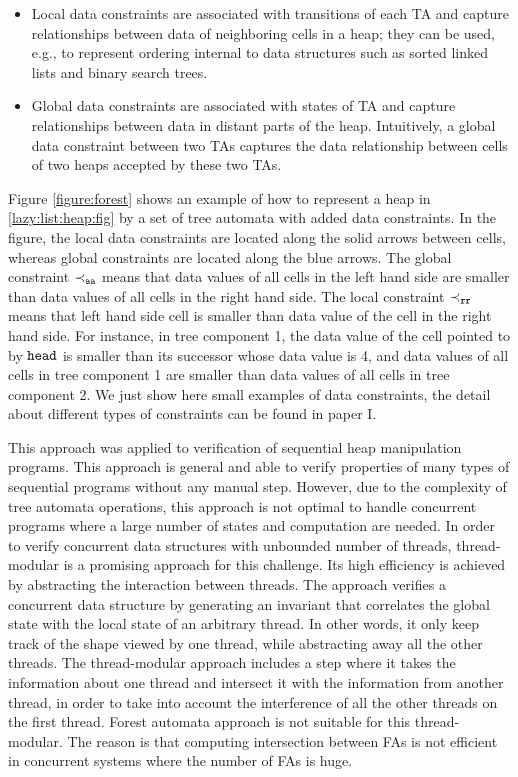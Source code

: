  \begin{itemize}
 	\item Local data constraints are associated with transitions of each TA and capture relationships between data of neighboring cells in a heap; they can be used, e.g., to represent ordering internal to data structures such as sorted linked lists and binary search trees.
 	\item Global data constraints are associated with states of TA and capture relationships between data in distant parts of the heap. Intuitively, a global data constraint between two TAs captures the data relationship between cells of two heaps accepted by these two TAs. 
 \end{itemize}
Figure \ref{figure:forest} shows an example of how to represent a heap in \ref{lazy:list:heap:fig} by a set of tree automata with added data constraints. In the figure, the local data constraints are located along the solid arrows between cells, whereas global constraints are located along the blue arrows. The global constraint $\tt \prec_{aa}$ means that data values of all cells in the left hand side are smaller than data values of all cells in the right hand side. The local constraint $\tt \prec_{rr}$ means that left hand side cell is smaller than data value of the cell in the right hand side. For instance, in tree component 1, the data value of the cell pointed to by $\tt head$ is smaller than its successor whose data value is 4, and data values of all cells in tree component 1 are smaller than data values of all cells in tree component 2. We just show here small examples of data constraints, the detail about different types of constraints can be found in paper I.    

This approach was applied to verification of sequential heap manipulation programs. This approach is general and able to verify properties of many types of sequential programs without any manual step. However, due to the complexity of tree automata operations, this approach is not optimal to handle concurrent programs where a large number of states and computation are needed. 
In order to verify concurrent data structures with unbounded number of threads, thread-modular is a promising approach for this challenge. Its high efficiency is achieved by
abstracting the interaction between threads. The approach verifies a concurrent data structure by generating an invariant that correlates the global state with the local state of an
arbitrary thread. In other words, it only keep track of the shape viewed by one thread, while abstracting away all the other threads. The thread-modular
approach includes a step where it takes the information about one thread and
intersect it with the information from another thread, in order to take into account the interference of all the other threads on the first thread. Forest automata approach is not suitable for this thread-modular. The reason is that computing intersection between FAs is not efficient in concurrent systems where the number of FAs is huge. 


